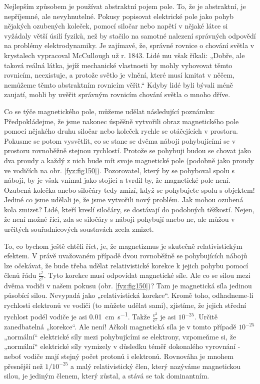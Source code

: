     Nejlepším způsobem je používat abstraktní pojem pole. To, že je abstraktní, je nepříjemné, ale  
    nevyhnutelné. Pokusy popisovat elektrické pole jako pohyb nějakých ozubených koleček, pomocí 
    siločar nebo napětí v nějaké látce si vyžádaly větší úsilí fyziků, než by stačilo na samotné 
    nalezení správných odpovědí na problémy elektrodynamiky. Je zajímavé, že, správné rovnice o 
    chování světla v krystalech vypracoval McCullough už r. 1843. Lidé mu však říkali: „Dobře, ale 
    taková reálná látka, jejíž mechanické vlastnosti by mohly vyhovovat těmto rovnicím, neexistuje, 
    a protože světlo je vlnění, které musí kmitat v něčem, nemůžeme těmto abstraktním rovnicím 
    věřit.“ Kdyby lidé byli bývali méně zaujatí, mohli by uvěřit správným rovnicím chování světla o 
    mnoho dříve.
    
    Co se týče magnetického pole, můžeme udělat následující poznámku: Předpokládejme, že jsme 
    nakonec úspěšně vytvořili obraz magnetického pole pomocí nějakého druhu siločar nebo koleček 
    rychle se otáčejících v prostoru. Pokusme se potom vysvětlit, co se stane se dvěma náboji 
    pohybujícími se v prostoru rovnoběžně stejnou rychlostí. Protože se pohybuji budou se chovat 
    jako dva proudy a každý z nich bude mít svoje magnetické pole (podobně jako proudy ve vodičích 
    na obr. \ref{fyz:fig150}). Pozorovatel, který by se pohyboval spolu s náboji, by je 
    však vnímal jako stojící a tvrdil by, že magnetické pole není. Ozubená kolečka anebo siločáry 
    tedy zmizí, když se pohybujete spolu s objektem! Jediné co jsme udělali je, že jsme vytvořili 
    nový problém. Jak mohou ozubená kola zmizet? Lidé, kteří kreslí siločáry, se dostávají do 
    podobných těžkostí. Nejen, že není možné říci, zda se siločáry s náboji pohybují anebo ne, ale 
    můžou v určitých souřadnicových soustavách zcela zmizet.
    
    To, co bychom ještě chtěli říct, je, že magnetizmus je skutečně relativistickým efektem. V právě
    uvažovaném případě dvou rovnoběžně se pohybujících nábojů lze očekávat, že bude třeba udělat  
    relativistické korekce k jejich pohybu pomocí členů řádu \(\frac{v^2}{c^2}\). Tyto korekce musí 
    odpovídat magnetické síle. Ale co se silou mezi dvěma vodiči v našem pokusu (obr. 
    \ref{fyz:fig150})? Tam je magnetická síla jedinou působící silou. Nevypadá jako 
    „relativistická korekce“. Kromě toho, odhadneme-li rychlosti elektronů ve vodiči (to můžete 
    udělat sami), zjistíme, že jejich střední rychlost podél vodiče je asi 
    \SI{0,01}{\centi\metre\per\second}. Takže \(\frac{v^2}{c^2}\) je asi \(10^{-25}\). Určitě 
    zanedbatelná „korekce“. Ale není! Ačkoli magnetická síla je v tomto případě \(10^{-25}\) 
    „normální“ elektrické síly mezi pohybujícími se elektrony, vzpomeňme si, že „normální“ 
    elektrické síly vymizely v důsledku téměř dokonalého vyrovnání - neboť vodiče mají stejný počet 
    protonů i elektronů. Rovnováha je mnohem přesnější než \(1/10^{-25}\) a malý relativistický 
    člen, který nazýváme magnetickou silou, je jediným členem, který zůstal, a stává se tak 
    dominantním.
    
